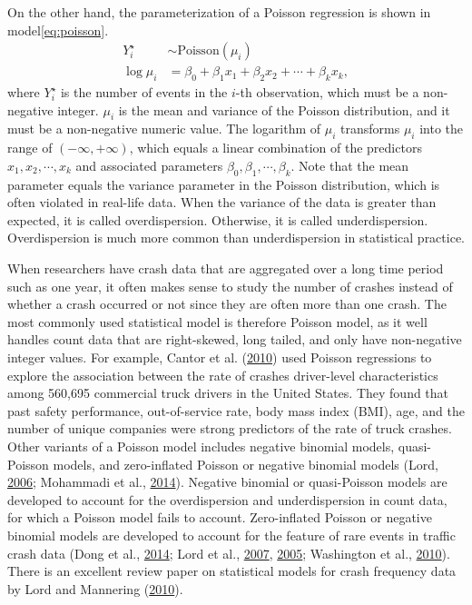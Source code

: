\documentclass[12pt]{book}
\numberwithin{equation}{chapter}
\begin{document}
On the other hand, the parameterization of a Poisson regression is shown in model\eqref{eq:poisson}.
\begin{equation}
\begin{split}
Y_i^\star & \sim \text{Poisson}(\mu_i) \\
\log\mu_i & = \beta_0 + \beta_1x_1 + \beta_2x_2 + \cdots + \beta_kx_k,
\label{eq:poisson}
\end{split}
\end{equation}
where \(Y_i^\star\) is the number of events in the \(i\)-th observation, which must be a non-negative integer. \(\mu_i\) is the mean and variance of the Poisson distribution, and it must be a non-negative numeric value. The logarithm of \(\mu_i\) transforms \(\mu_i\) into the range of \((-\infty, +\infty)\), which equals a linear combination of the predictors \(x_1, x_2, \cdots, x_k\) and associated parameters \(\beta_0, \beta_1, \cdots, \beta_k\). Note that the mean parameter equals the variance parameter in the Poisson distribution, which is often violated in real-life data. When the variance of the data is greater than expected, it is called overdispersion. Otherwise, it is called underdispersion. Overdispersion is much more common than underdispersion in statistical practice.

When researchers have crash data that are aggregated over a long time period such as one year, it often makes sense to study the number of crashes instead of whether a crash occurred or not since they are often more than one crash. The most commonly used statistical model is therefore Poisson model, as it well handles count data that are right-skewed, long tailed, and only have non-negative integer values. For example, Cantor et al. (\protect\hyperlink{ref-cantor2010driver}{2010}) used Poisson regressions to explore the association between the rate of crashes driver-level characteristics among 560,695 commercial truck drivers in the United States. They found that past safety performance, out-of-service rate, body mass index (BMI), age, and the number of unique companies were strong predictors of the rate of truck crashes.
Other variants of a Poisson model includes negative binomial models, quasi-Poisson models, and zero-inflated Poisson or negative binomial models (Lord, \protect\hyperlink{ref-lord2006modeling}{2006}; Mohammadi et al., \protect\hyperlink{ref-mohammadi2014crash}{2014}). Negative binomial or quasi-Poisson models are developed to account for the overdispersion and underdispersion in count data, for which a Poisson model fails to account. Zero-inflated Poisson or negative binomial models are developed to account for the feature of rare events in traffic crash data (Dong et al., \protect\hyperlink{ref-dong2014multivariate}{2014}; Lord et al., \protect\hyperlink{ref-lord2007further}{2007}, \protect\hyperlink{ref-lord2005poisson}{2005}; Washington et al., \protect\hyperlink{ref-washington2010statistical}{2010}). There is an excellent review paper on statistical models for crash frequency data by Lord and Mannering (\protect\hyperlink{ref-lord2010statistical}{2010}).
\end{document}
